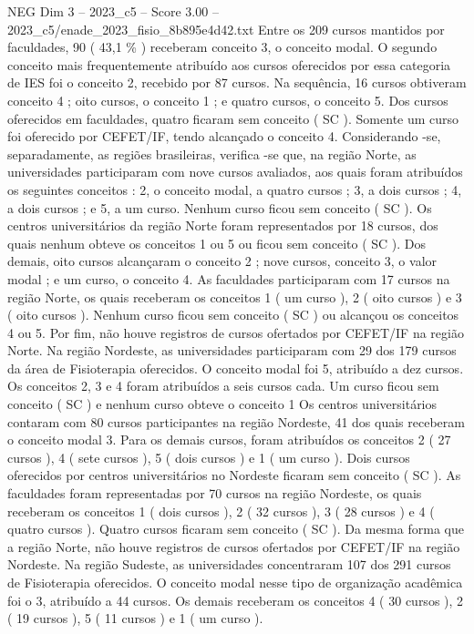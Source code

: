 \begin{textsample}{NEG Dim 3 – 2023\_c5 – Score 3.00 – 2023\_c5/enade\_2023\_fisio\_8b895e4d42.txt}
Entre os 209 cursos mantidos por faculdades, 90 ( 43,1 \% ) receberam conceito 3, o conceito modal.
O segundo conceito mais frequentemente atribuído aos cursos oferecidos por essa categoria de IES foi o conceito 2, recebido por 87 cursos.
Na sequência, 16 cursos obtiveram conceito 4 ; oito cursos, o conceito 1 ; e quatro cursos, o conceito 5.
Dos cursos oferecidos em faculdades, quatro ficaram sem conceito ( SC ).
Somente um curso foi oferecido por CEFET/IF, tendo alcançado o conceito 4.
Considerando -se, separadamente, as regiões brasileiras, verifica -se que, na região Norte, as universidades participaram com nove cursos avaliados, aos quais foram atribuídos os seguintes conceitos : 2, o conceito modal, a quatro cursos ; 3, a dois cursos ; 4, a dois cursos ; e 5, a um curso.
Nenhum curso ficou sem conceito ( SC ).
Os centros universitários da região Norte foram representados por 18 cursos, dos quais nenhum obteve os conceitos 1 ou 5 ou ficou sem conceito ( SC ).
Dos demais, oito cursos alcançaram o conceito 2 ; nove cursos, conceito 3, o valor modal ; e um curso, o conceito 4.
As faculdades participaram com 17 cursos na região Norte, os quais receberam os conceitos 1 ( um curso ), 2 ( oito cursos ) e 3 ( oito cursos ).
Nenhum curso ficou sem conceito ( SC ) ou alcançou os conceitos 4 ou 5.
Por fim, não houve registros de cursos ofertados por CEFET/IF na região Norte.
Na região Nordeste, as universidades participaram com 29 dos 179 cursos da área de Fisioterapia oferecidos.
O conceito modal foi 5, atribuído a dez cursos.
Os conceitos 2, 3 e 4 foram atribuídos a seis cursos cada.
Um curso ficou sem conceito ( SC ) e nenhum curso obteve o conceito 1 Os centros universitários contaram com 80 cursos participantes na região Nordeste, 41 dos quais receberam o conceito modal 3.
Para os demais cursos, foram atribuídos os conceitos 2 ( 27 cursos ), 4 ( sete cursos ), 5 ( dois cursos ) e 1 ( um curso ).
Dois cursos oferecidos por centros universitários no Nordeste ficaram sem conceito ( SC ).
As faculdades foram representadas por 70 cursos na região Nordeste, os quais receberam os conceitos 1 ( dois cursos ), 2 ( 32 cursos ), 3 ( 28 cursos ) e 4 ( quatro cursos ).
Quatro cursos ficaram sem conceito ( SC ).
Da mesma forma que a região Norte, não houve registros de cursos ofertados por CEFET/IF na região Nordeste.
Na região Sudeste, as universidades concentraram 107 dos 291 cursos de Fisioterapia oferecidos.
O conceito modal nesse tipo de organização acadêmica foi o 3, atribuído a 44 cursos.
Os demais receberam os conceitos 4 ( 30 cursos ), 2 ( 19 cursos ), 5 ( 11 cursos ) e 1 ( um curso ).

\end{textsample}
